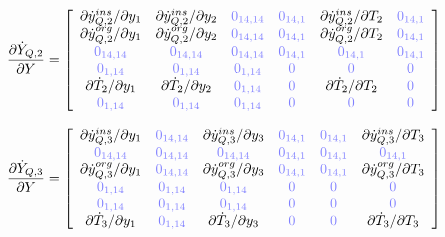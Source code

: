 \documentclass[a4paper,10pt]{article}
\newcommand{\zm}[1]{\ensuremath{ {\color{opaqueblue} 0_{#1} } }}
\begin{document}
\begin{equation}
\frac{\partial\dot{Y}_{Q,2}}{\partial Y}=
\left[ \begin{array}{cccccc}
\partial\dot{y}_{Q,2}^{ins} / \partial y_1 & \partial\dot{y}_{Q,2}^{ins} / \partial y_2 & \zm{14,14} & \zm{14,1} & \partial\dot{y}_{Q,2}^{ins} / \partial T_2 & \zm{14,1} \\
\partial\dot{y}_{Q,2}^{org} / \partial y_1 & \partial\dot{y}_{Q,2}^{org} / \partial y_2 & \zm{14,14} & \zm{14,1} & \partial\dot{y}_{Q,2}^{org} / \partial T_2 & \zm{14,1} \\
\zm{14,14}                                 & \zm{14,14}                                 & \zm{14,14} & \zm{14,1} & \zm{14,1}                                  & \zm{14,1} \\
\zm{1,14}                                  & \zm{1,14}                                  & \zm{1,14}  & \zm{}     & \zm{}                                      & \zm{} \\
\partial\dot{T}_2 / \partial y_1           & \partial\dot{T}_2 / \partial y_2           & \zm{1,14}  & \zm{}     & \partial\dot{T}_2 / \partial T_2           & \zm{} \\
\zm{1,14}                                  & \zm{1,14}                                  & \zm{1,14}  & \zm{}     & \zm{}                                      & \zm{} \\
\end{array}  \right]
\end{equation}

\begin{equation}
\frac{\partial\dot{Y}_{Q,3}}{\partial Y}=
\left[ \begin{array}{cccccc}
\partial\dot{y}_{Q,3}^{ins} / \partial y_1 & \zm{14,14} & \partial\dot{y}_{Q,3}^{ins} / \partial y_3 & \zm{14,1} & \zm{14,1} & \partial\dot{y}_{Q,3}^{ins} / \partial T_3  \\
\zm{14,14}                                 & \zm{14,14} & \zm{14,14}                                 & \zm{14,1} & \zm{14,1} & \zm{14,1} \\
\partial\dot{y}_{Q,3}^{org} / \partial y_1 & \zm{14,14} & \partial\dot{y}_{Q,3}^{org} / \partial y_3 & \zm{14,1} & \zm{14,1} & \partial\dot{y}_{Q,3}^{org} / \partial T_3  \\
\zm{1,14}                                  & \zm{1,14}  & \zm{1,14}                                  & \zm{}     & \zm{}     & \zm{} \\
\zm{1,14}                                  & \zm{1,14}  & \zm{1,14}                                  & \zm{}     & \zm{}     & \zm{} \\
\partial\dot{T}_3 / \partial y_1           & \zm{1,14}  & \partial\dot{T}_3 / \partial y_3           & \zm{}     & \zm{}     & \partial\dot{T}_3 / \partial T_3 \\
\end{array}  \right]
\end{equation}
\end{document}
